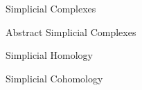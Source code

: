 \documentclass[../main.tex]{subfiles}
\begin{document}
    \begin{section}{Simplicial Complexes} 
            
    \end{section}
    \begin{section}{Abstract Simplicial Complexes} 
            
    \end{section}
    \begin{section}{Simplicial Homology}
            
    \end{section}
    \begin{section}{Simplicial Cohomology}
         
    \end{section}
\end{document}
